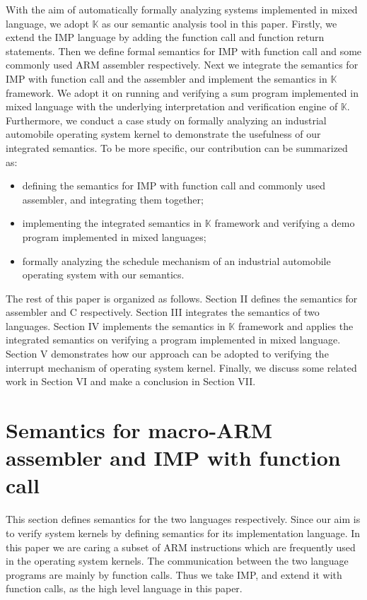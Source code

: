\documentclass[letterpaper, 10 pt, conference]{IEEEtran}
\begin{document}
 With the aim of automatically formally analyzing systems implemented in mixed language, we adopt $\mathbb{K}$ as our semantic analysis tool in this paper.
 Firstly, we extend the IMP language by adding the function call and function return statements. Then we define formal semantics for IMP with function call and some commonly used ARM assembler respectively. Next we integrate the semantics for IMP with function call and the assembler and implement the semantics in $\mathbb{K}$ framework. We adopt it on running and verifying a sum program implemented in mixed language with the underlying interpretation and verification engine of $\mathbb{K}$. Furthermore, we conduct a case study on formally analyzing an industrial automobile operating system kernel to demonstrate the usefulness of our integrated semantics. To be more specific, our contribution can be summarized as:
\begin{itemize}
	\item defining the semantics for IMP with function call and commonly used assembler, and integrating them together;
	\item implementing the integrated semantics in $\mathbb{K}$ framework and verifying a demo program implemented in mixed languages;
	\item formally analyzing the schedule mechanism of an industrial automobile operating system with our semantics.
\end{itemize}

 The rest of this paper is organized as follows. Section II defines the semantics for assembler and C respectively. Section III integrates the semantics of two languages. Section IV implements the semantics in $\mathbb{K}$ framework and applies the integrated semantics on verifying a program implemented in mixed language. Section V demonstrates how our approach can be adopted to verifying the interrupt mechanism of operating system kernel. Finally, we discuss some related
 work in Section VI and make a conclusion in Section VII.

\section{Semantics for macro-ARM assembler and IMP with function call}
\par This section defines semantics for the two languages respectively. Since our aim is to verify system kernels by defining semantics for its implementation language. In this paper we are caring a subset of ARM instructions which are frequently used in the operating system kernels. The communication between the two language programs are mainly by function calls. Thus we take IMP, and extend it with function calls, as the high level language in this paper.
\end{document}
